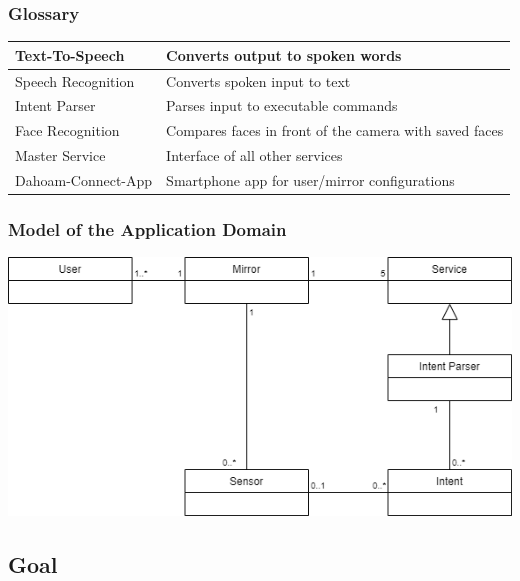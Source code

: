 \documentclass[12pt]{article}
\theoremstyle{definition}
\begin{document}
\subsubsection{Glossary}

\begin{flushleft}
\begin{tabular}{|l|l|}
\hline
Text-To-Speech & Converts output to spoken words\\ \hline
Speech Recognition & Converts spoken input to text\\ \hline
Intent Parser & Parses input to executable commands\\ \hline
Face Recognition & Compares faces in front of the camera with saved faces\\ \hline
Master Service & Interface of all other services\\ \hline
Dahoam-Connect-App & Smartphone app for user/mirror configurations\\ \hline
\end{tabular}
\end{flushleft} 
\subsubsection{Model of the Application Domain}
\includegraphics[scale=.6]{ClassDiagram.png}

\pagebreak
\subsection{Goal}
\end{document}
